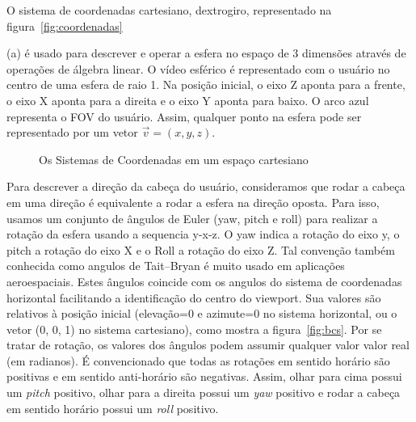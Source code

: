 O sistema de coordenadas cartesiano, dextrogiro, representado na figura~\ref{fig:coordenadas}{(a) é usado para descrever e operar a esfera no espaço de 3 dimensões através de operações de álgebra linear. O vídeo esférico é representado com o usuário no centro de uma esfera de raio 1. Na posição inicial, o eixo Z aponta para a frente, o eixo X aponta para a direita e o eixo Y aponta para baixo. O arco azul representa o FOV do usuário. Assim, qualquer ponto na esfera pode ser representado por um vetor $ \overrightarrow{v} = (x,y,z) $.

\begin{figure}[h]
	\centering
	
	 \quad
	
	 \quad
	
	\caption{Os Sistemas de Coordenadas em um espaço cartesiano}
	\label{fig:coord_sis}
\end{figure}

Para descrever a direção da cabeça do usuário, consideramos que rodar a cabeça em uma direção é equivalente a rodar a esfera na direção oposta. Para isso, usamos um conjunto de ângulos de Euler (yaw, pitch e roll) para realizar a rotação da esfera usando a sequencia y-x-z. O yaw indica a rotação do eixo y, o pitch a rotação do eixo X e o Roll a rotação do eixo Z. Tal convenção também conhecida como angulos de Tait–Bryan é muito usado em aplicações aeroespaciais. Estes ângulos coincide com os angulos do sistema de coordenadas horizontal facilitando a identificação do centro do viewport. Sua valores são relativos à posição inicial (elevação=0 e azimute=0 no sistema horizontal, ou o vetor (0, 0, 1) no sistema cartesiano), como mostra a figura~\ref{fig:bcs}. Por se tratar de rotação, os valores dos ângulos podem assumir qualquer valor valor real (em radianos).
É convencionado que todas as rotações em sentido horário são positivas e em sentido anti-horário são negativas. Assim, olhar para cima possui um \textit{pitch} positivo, olhar para a direita possui um \textit{yaw} positivo e rodar a cabeça em sentido horário possui um \textit{roll} positivo.

}
